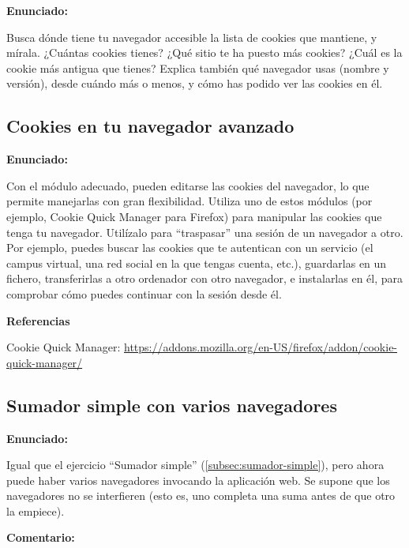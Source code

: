 \textbf{Enunciado:}

Busca dónde tiene tu navegador accesible la lista de cookies que mantiene, y mírala. ¿Cuántas cookies tienes? ¿Qué sitio te ha puesto más cookies? ¿Cuál es la cookie más antigua que tienes? Explica también qué navegador usas (nombre y versión), desde cuándo más o menos, y cómo has podido ver las cookies en él.


\subsection{Cookies en tu navegador avanzado}
\label{subsec:cookies-navegador-2}

\textbf{Enunciado:}

Con el módulo adecuado, pueden editarse las cookies del navegador, lo que permite manejarlas con gran flexibilidad. Utiliza uno de estos módulos (por ejemplo, Cookie Quick Manager para Firefox) para manipular las cookies que tenga tu navegador. Utilízalo para ``traspasar'' una sesión de un navegador a otro. Por ejemplo, puedes buscar las cookies que te autentican con un servicio (el campus virtual, una red social en la que tengas cuenta, etc.), guardarlas en un fichero, transferirlas a otro ordenador con otro navegador, e instalarlas en él, para comprobar cómo puedes continuar con la sesión desde él.

\textbf{Referencias}

Cookie Quick Manager: \url{https://addons.mozilla.org/en-US/firefox/addon/cookie-quick-manager/}


\subsection{Sumador simple con varios navegadores}
\label{subsec:sumador-simple-varios}

\textbf{Enunciado:}

Igual que el ejercicio ``Sumador simple'' (\ref{subsec:sumador-simple}), pero ahora puede haber varios navegadores invocando la aplicación web. Se supone que los navegadores no se interfieren (esto es, uno completa una suma antes de que otro la empiece).

\textbf{Comentario:}

